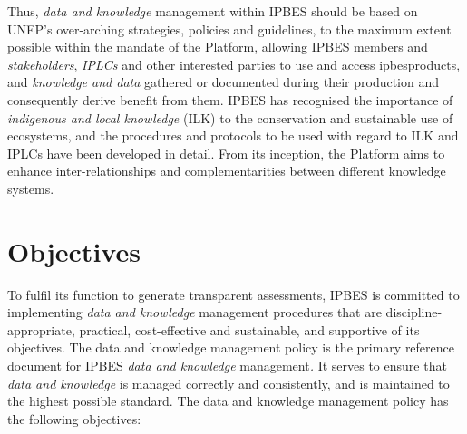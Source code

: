 \documentclass{article}
\begin{document}
Thus, \textit{data and knowledge }management within IPBES should be based on UNEP’s over-arching strategies, policies and guidelines, to the maximum extent possible within the mandate of the Platform, allowing IPBES members and \textit{stakeholders}, \textit{IPLCs} and other interested parties to use and access \gls{ipbesproducts}, and \textit{knowledge and data} gathered or documented during their production and consequently derive benefit from them. IPBES has recognised the importance of \textit{indigenous and local knowledge }(ILK) to the conservation and sustainable use of ecosystems, and the procedures and protocols to be used with regard to ILK and IPLCs have been developed in detail. From its inception, the Platform aims to enhance inter-relationships and complementarities between different knowledge systems.

\section{Objectives}

To fulfil its function to generate transparent assessments, IPBES is committed to implementing \textit{data and knowledge} management procedures that are discipline-appropriate, practical, cost-effective and sustainable, and supportive of its objectives. The data and knowledge management policy is the primary reference document for IPBES \textit{data and knowledge }management\textit{.} It serves to ensure that \textit{data and knowledge} is managed correctly and consistently, and is maintained to the highest possible standard. The data and knowledge management policy has the following objectives:
\end{document}
